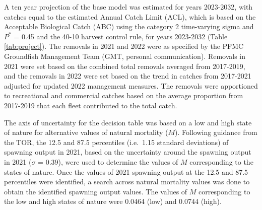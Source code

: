 \documentclass[11pt,
  english,
  letterpaper,
]{article}
\begin{document}
\leavevmode\tagmcend\tagstructend


A ten year projection of the base model was estimated for years 2023-2032, with catches equal to the estimated Annual Catch Limit (ACL), which is based on the Acceptable Biological Catch (ABC) using the category 2 time-varying sigma and {\(P^*\)\leavevmode\tagmcend\tagstructend} = 0.45 and the 40-10 harvest control rule, for years 2023-2032 (Table \ref{tab:project}). The removals in 2021 and 2022 were as specified by the PFMC Groundfish Management Team (GMT, personal communication). Removals in 2021 were set based on the combined total removals averaged from 2017-2019, and the removals in 2022 were set based on the trend in catches from 2017-2021 adjusted for updated 2022 management measures. The removals were apportioned to recreational and commercial catches based on the average proportion from 2017-2019 that each fleet contributed to the total catch.

\leavevmode\tagmcend\tagstructend\par


The axis of uncertainty for the decision table was based on a low and high state of nature for alternative values of natural mortality ({\(M\)\leavevmode\tagmcend\tagstructend}). Following guidance from the TOR, the 12.5 and 87.5 percentiles (i.e.~1.15 standard deviations) of spawning output in 2021, based on the uncertainty around the spawning output in 2021 ({\(\sigma\)\leavevmode\tagmcend\tagstructend} = 0.39), were used to determine the values of {\(M\)\leavevmode\tagmcend\tagstructend} corresponding to the states of nature. Once the values of 2021 spawning output at the 12.5 and 87.5 percentiles were identified, a search across natural mortality values was done to obtain the identified spawning output values. The values of {\(M\)\leavevmode\tagmcend\tagstructend} corresponding to the low and high states of nature were 0.0464 (low) and 0.0744 (high).

\leavevmode\tagmcend\tagstructend\par

\end{document}
